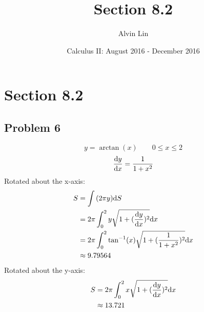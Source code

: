 \documentclass[letterpaper, 12pt]{math}
\title{Section 8.2}
\author{Alvin Lin}
\date{Calculus II: August 2016 - December 2016}
\begin{document}
\maketitle

\section*{Section 8.2}

\subsection*{Problem 6}
\[ y = \arctan(x) \quad \quad 0 \leq x \leq 2 \]
\[ \frac{\mathrm{d}{y}}{\mathrm{d}{x}} = \frac{1}{1+x^{2}} \]
Rotated about the x-axis:
\begin{align*}
  S &= \int{(2\pi y)\mathrm{d}{S}} \\
  &= 2\pi\int_{0}^{2}{y\sqrt{1+(\frac{\mathrm{d}{y}}{\mathrm{d}{x}})^{2}}\mathrm{d}{x}} \\
  &= 2\pi\int_{0}^{2}{\tan^{-1}(x)\sqrt{1+(\frac{1}{1+x^{2}})^{2}}\mathrm{d}{x}} \\
  & \approx 9.79564
\end{align*}
Rotated about the y-axis:
\begin{align*}
  S &= 2\pi\int_{0}^{2}{x\sqrt{1+(\frac{\mathrm{d}{y}}{\mathrm{d}{x}})^{2}}\mathrm{d}{x}} \\
  & \approx 13.721
\end{align*}
\end{document}
